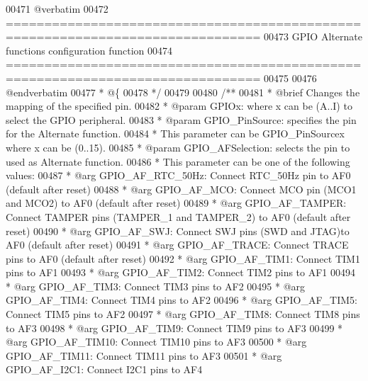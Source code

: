 \begin{DoxyCode}
00471 \textcolor{comment}{@verbatim   }
00472 \textcolor{comment}{ ===============================================================================}
00473 \textcolor{comment}{               GPIO Alternate functions configuration function}
00474 \textcolor{comment}{ ===============================================================================  }
00475 \textcolor{comment}{}
00476 \textcolor{comment}{@endverbatim}
00477 \textcolor{comment}{  * @\{}
00478 \textcolor{comment}{  */}
00479 
00480 \textcolor{comment}{/**}
00481 \textcolor{comment}{  * @brief  Changes the mapping of the specified pin.}
00482 \textcolor{comment}{  * @param  GPIOx: where x can be (A..I) to select the GPIO peripheral.}
00483 \textcolor{comment}{  * @param  GPIO\_PinSource: specifies the pin for the Alternate function.}
00484 \textcolor{comment}{  *         This parameter can be GPIO\_PinSourcex where x can be (0..15).}
00485 \textcolor{comment}{  * @param  GPIO\_AFSelection: selects the pin to used as Alternate function.}
00486 \textcolor{comment}{  *          This parameter can be one of the following values:}
00487 \textcolor{comment}{  *            @arg GPIO\_AF\_RTC\_50Hz: Connect RTC\_50Hz pin to AF0 (default after reset) }
00488 \textcolor{comment}{  *            @arg GPIO\_AF\_MCO: Connect MCO pin (MCO1 and MCO2) to AF0 (default after reset) }
00489 \textcolor{comment}{  *            @arg GPIO\_AF\_TAMPER: Connect TAMPER pins (TAMPER\_1 and TAMPER\_2) to AF0 (default after
       reset) }
00490 \textcolor{comment}{  *            @arg GPIO\_AF\_SWJ: Connect SWJ pins (SWD and JTAG)to AF0 (default after reset) }
00491 \textcolor{comment}{  *            @arg GPIO\_AF\_TRACE: Connect TRACE pins to AF0 (default after reset)}
00492 \textcolor{comment}{  *            @arg GPIO\_AF\_TIM1: Connect TIM1 pins to AF1}
00493 \textcolor{comment}{  *            @arg GPIO\_AF\_TIM2: Connect TIM2 pins to AF1}
00494 \textcolor{comment}{  *            @arg GPIO\_AF\_TIM3: Connect TIM3 pins to AF2}
00495 \textcolor{comment}{  *            @arg GPIO\_AF\_TIM4: Connect TIM4 pins to AF2}
00496 \textcolor{comment}{  *            @arg GPIO\_AF\_TIM5: Connect TIM5 pins to AF2}
00497 \textcolor{comment}{  *            @arg GPIO\_AF\_TIM8: Connect TIM8 pins to AF3}
00498 \textcolor{comment}{  *            @arg GPIO\_AF\_TIM9: Connect TIM9 pins to AF3}
00499 \textcolor{comment}{  *            @arg GPIO\_AF\_TIM10: Connect TIM10 pins to AF3}
00500 \textcolor{comment}{  *            @arg GPIO\_AF\_TIM11: Connect TIM11 pins to AF3}
00501 \textcolor{comment}{  *            @arg GPIO\_AF\_I2C1: Connect I2C1 pins to AF4}

\end{DoxyCode}
